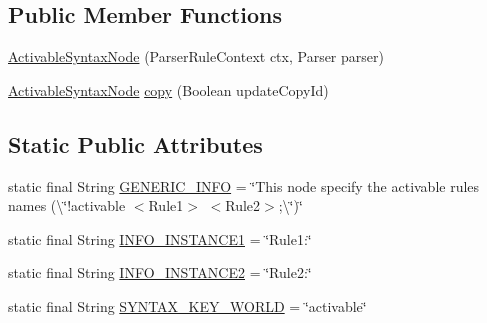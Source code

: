 \subsection*{Public Member Functions}
\begin{DoxyCompactItemize}
\item 
\hyperlink{classit_1_1emarolab_1_1cagg_1_1core_1_1language_1_1syntax_1_1abstractTree_1_1syntaxNodeType_1_1ActivableSyntaxNode_a64b044a26e2b7c9e668dc6d7f9e49a80}{Activable\-Syntax\-Node} (Parser\-Rule\-Context ctx, Parser parser)
\item 
\hyperlink{classit_1_1emarolab_1_1cagg_1_1core_1_1language_1_1syntax_1_1abstractTree_1_1syntaxNodeType_1_1ActivableSyntaxNode}{Activable\-Syntax\-Node} \hyperlink{classit_1_1emarolab_1_1cagg_1_1core_1_1language_1_1syntax_1_1abstractTree_1_1syntaxNodeType_1_1ActivableSyntaxNode_ab522699d0eec2831f50de80ea0b0fcaa}{copy} (Boolean update\-Copy\-Id)
\end{DoxyCompactItemize}
\subsection*{Static Public Attributes}
\begin{DoxyCompactItemize}
\item 
static final String \hyperlink{classit_1_1emarolab_1_1cagg_1_1core_1_1language_1_1syntax_1_1abstractTree_1_1syntaxNodeType_1_1ActivableSyntaxNode_a2f7713173ced6332056bee502c9f5be7}{G\-E\-N\-E\-R\-I\-C\-\_\-\-I\-N\-F\-O} = \char`\"{}This node specify the activable rules names (\textbackslash{}\char`\"{}!activable $<$Rule1$>$ $<$Rule2$>$;\textbackslash{}\char`\"{})\char`\"{}
\item 
static final String \hyperlink{classit_1_1emarolab_1_1cagg_1_1core_1_1language_1_1syntax_1_1abstractTree_1_1syntaxNodeType_1_1ActivableSyntaxNode_a781836a7e68c75ca60a029908dce1f5c}{I\-N\-F\-O\-\_\-\-I\-N\-S\-T\-A\-N\-C\-E1} = \char`\"{}Rule1\-:\char`\"{}
\item 
static final String \hyperlink{classit_1_1emarolab_1_1cagg_1_1core_1_1language_1_1syntax_1_1abstractTree_1_1syntaxNodeType_1_1ActivableSyntaxNode_a0181f785b091db69f9fdf2a01e37f376}{I\-N\-F\-O\-\_\-\-I\-N\-S\-T\-A\-N\-C\-E2} = \char`\"{}Rule2\-:\char`\"{}
\item 
static final String \hyperlink{classit_1_1emarolab_1_1cagg_1_1core_1_1language_1_1syntax_1_1abstractTree_1_1syntaxNodeType_1_1ActivableSyntaxNode_af6a2bd9146e74161317d574e98ae2dc1}{S\-Y\-N\-T\-A\-X\-\_\-\-K\-E\-Y\-\_\-\-W\-O\-R\-L\-D} = \char`\"{}activable\char`\"{}
\end{DoxyCompactItemize}
